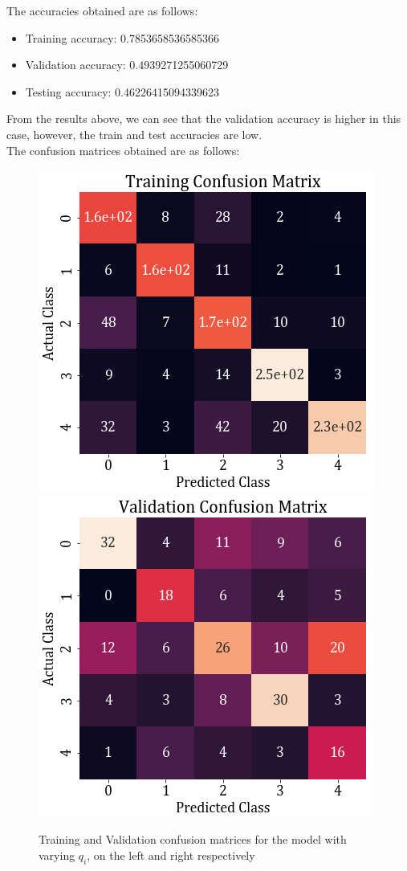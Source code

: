 \documentclass[11pt,a4paper]{article}
\newcommand{\noi}{\noindent}
\begin{document}
\noi
The accuracies obtained are as follows:
\begin{itemize}
    \itemsep0em
    \item Training accuracy: 0.7853658536585366
    \item Validation accuracy: 0.4939271255060729
    \item Testing accuracy: 0.46226415094339623
\end{itemize}

\noi
From the results above, we can see that the validation accuracy is higher in this case, however, the train and test accuracies are low.\\

\noi
The confusion matrices obtained are as follows:
\begin{figure}[H]
    \centering
    \includegraphics[scale=0.5]{images/2A/2a_full_cross_train.png}
    \includegraphics[scale=0.5]{images/2A/2a_full_cross_val.png}
    \caption{Training and Validation confusion matrices for the model with varying $q_i$, on the left and right respectively}
\end{figure}
\end{document}
